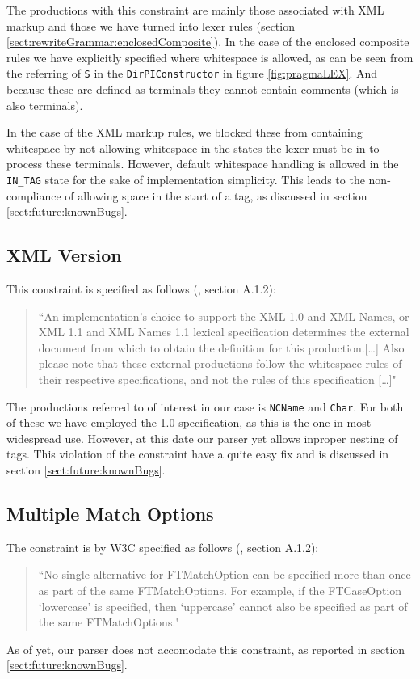 The productions with this constraint are mainly those associated with XML markup and those we have turned into lexer rules (section \ref{sect:rewriteGrammar:enclosedComposite}). In the case of the enclosed composite rules we have explicitly specified where whitespace is allowed, as can be seen from the referring of \verb!S! in the \verb!DirPIConstructor! in figure \ref{fig:pragmaLEX}. And because these are defined as terminals they cannot contain comments (which is also terminals).

In the case of the XML markup rules, we blocked these from containing whitespace by not allowing whitespace in the states the lexer must be in to process these terminals. However, default whitespace handling is allowed in the \verb!IN_TAG! state for the sake of implementation simplicity. This leads to the non-compliance of allowing space in the start of a tag, as discussed in section \ref{sect:future:knownBugs}.


\subsection{XML Version}
\label{sect:implementation:xmlVersion}
This constraint is specified as follows (\cite{w3c00}, section A.1.2):
\begin{quote}
``An implementation's choice to support the XML 1.0 and XML Names, or XML 1.1 and XML Names 1.1 lexical specification determines the external document from which to obtain the definition for this production.[\ldots] Also please note that these external productions follow the whitespace rules of their respective specifications, and not the rules of this specification [\ldots]"
\end{quote}

The productions referred to of interest in our case is \verb!NCName! and \verb!Char!. For both of these we have employed the 1.0 specification, as this is the one in most widespread use. However, at this date our parser yet allows inproper nesting of tags. This violation of the constraint have a quite easy fix and is discussed in section \ref{sect:future:knownBugs}.

\subsection{Multiple Match Options}
\label{sect:implementation:multipleMatchOptions}
The constraint is by W3C specified as follows (\cite{w3c00}, section A.1.2):
\begin{quote}
``No single alternative for FTMatchOption can be specified more than once as part of the same FTMatchOptions. For example, if the FTCaseOption `lowercase' is specified, then `uppercase' cannot also be specified as part of the same FTMatchOptions."
\end{quote}

As of yet, our parser does not accomodate this constraint, as reported in section \ref{sect:future:knownBugs}.


